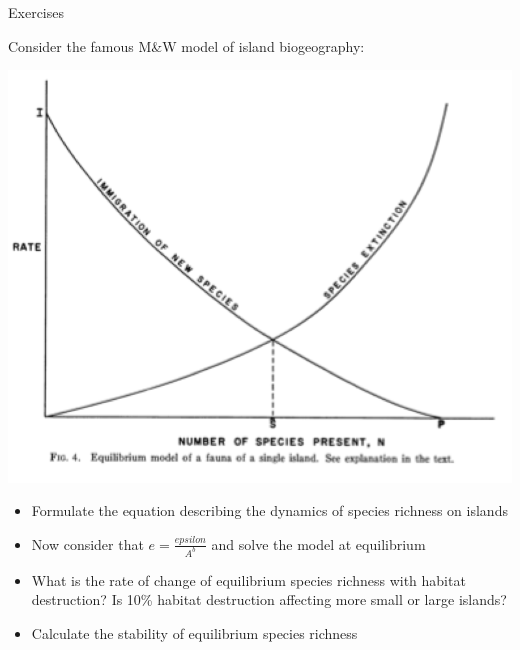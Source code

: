 \documentclass{eecslides}
\begin{document}

	\begin{frame}{Exercises}
		
		Consider the famous M\&W model of island biogeography:
		\begin{center}
			\includegraphics[height=0.4\textheight]{IBT.png}
		\end{center}
		
		\begin{itemize}
			\item Formulate the equation describing the dynamics of species richness on islands
			\item Now consider that $e = \frac{epsilon}{A^b}$ and solve the model at equilibrium
			\item What is the rate of change of equilibrium species richness with habitat destruction? Is 10\% habitat destruction affecting more small or large islands?
			\item Calculate the stability of equilibrium species richness
		\end{itemize}

	\end{frame}

\end{document}
